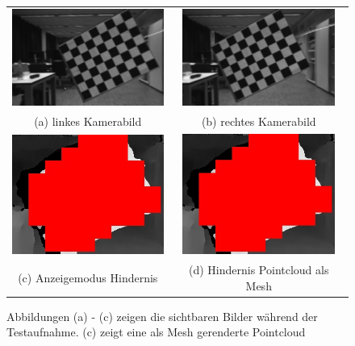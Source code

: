 	\begin{figure}[h]
		\centering
		\begin{tabular}{c c}
			\includegraphics[width=5.0cm]{img/evaluation/test_set/_test_3_left}&
   			\includegraphics[width=5.0cm]{img/evaluation/test_set/_test_3_right}\\
			(a) linkes Kamerabild & (b) rechtes Kamerabild\\
			\includegraphics[width=5.0cm]{img/evaluation/test_set/_test_3_disparity}&
		    \includegraphics[width=5.0cm]{img/evaluation/test_set/_test_3_disparity}\\
			(c) Anzeigemodus Hindernis & (d) Hindernis Pointcloud als Mesh
		\end{tabular}
		\label{fig:test_viewing}
		\caption{Abbildungen (a) - (c) zeigen die sichtbaren Bilder während der Testaufnahme. (c) zeigt eine als Mesh gerenderte Pointcloud}
	\end{figure}
    
    
